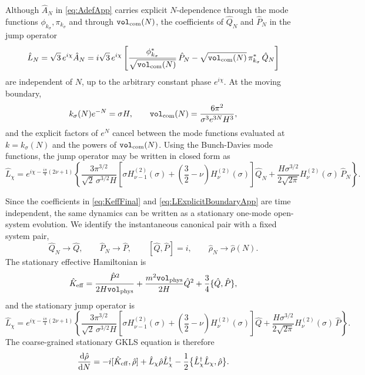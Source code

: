 \documentclass{article}
\newcommand{\VF}{\mathtt{vol}_{\rm com}}
\newcommand{\Vphys}{\mathtt{vol}_{\rm phys}}
\numberwithin{equation}{section}
\begin{document}
	Although \(\hat A_N\) in \cref{eq:AdefApp} carries explicit \(N\)-dependence through the mode functions \(\phi_{k_\sigma},\pi_{k_\sigma}\) and through \(\VF(N)\), the coefficients of \(\hat Q_N\) and \(\hat P_N\) in the jump operator
	\begin{equation}
		\hat L_N = \sqrt3\,e^{i\chi}\hat A_N = i\sqrt3\,e^{i\chi} \left[ \frac{\phi_{k_\sigma}^*}{\sqrt{\VF(N)}}\,\hat P_N - \sqrt{\VF(N)}\,\pi_{k_\sigma}^*\,\hat Q_N \right]
		\label{eq:LGeneralBoundaryApp}
	\end{equation}
	are independent of \(N\), up to the arbitrary constant phase \(e^{i\chi}\). At the moving boundary,
	\begin{equation}
		k_\sigma(N)e^{-N} = \sigma H, \qquad \VF(N) = \frac{6\pi^2}{\sigma^3 e^{3N}H^3},
	\end{equation}
	and the explicit factors of \(e^N\) cancel between the mode functions evaluated at \(k=k_\sigma(N)\) and the powers of \(\VF(N)\). Using the Bunch-Davies mode functions, the jump operator may be written in closed form as
	\begin{equation}
		\hat L_\chi = e^{i\chi-\tfrac{i\pi}{4}(2\nu+1)} \left\{ \frac{3\pi^{3/2}}{\sqrt2\,\sigma^{3/2}H} \left[ \sigma H_{\nu-1}^{(2)}(\sigma) + \left( \frac32-\nu \right)H_\nu^{(2)}(\sigma) \right]\hat Q_N + \frac{H\sigma^{3/2}}{2\sqrt{2\pi}} H_\nu^{(2)}(\sigma)\,\hat P_N \right\}.
		\label{eq:LExplicitBoundaryApp}
	\end{equation}

	Since the coefficients in \cref{eq:KeffFinal} and \cref{eq:LExplicitBoundaryApp} are time independent, the same dynamics can be written as a stationary one-mode open-system evolution. We identify the instantaneous canonical pair with a fixed system pair,
	\begin{equation}
		\hat Q_N\to \hat Q, \qquad \hat P_N\to \hat P, \qquad [\hat Q,\hat P]=i, \qquad \hat\rho_N\to\hat\rho(N).
	\end{equation}
	The stationary effective Hamiltonian is
	\begin{equation}
		\hat K_{\rm eff} = \frac{\hat P^2}{2H\Vphys} + \frac{m^2\Vphys}{2H}\hat Q^2 + \frac{3}{4}\{\hat Q,\hat P\},
		\label{eq:KeffStationaryApp}
	\end{equation}
	and the stationary jump operator is
	\begin{equation}
		\hat L_\chi = e^{i\chi-\tfrac{i\pi}{4}(2\nu+1)} \left\{ \frac{3\pi^{3/2}}{\sqrt2\,\sigma^{3/2}H} \left[ \sigma H_{\nu-1}^{(2)}(\sigma) + \left( \frac32-\nu \right)H_\nu^{(2)}(\sigma) \right]\hat Q + \frac{H\sigma^{3/2}}{2\sqrt{2\pi}} H_\nu^{(2)}(\sigma)\,\hat P \right\}.
		\label{eq:LStationaryApp}
	\end{equation}
	The coarse-grained stationary GKLS equation is therefore
	\begin{equation}
		\frac{\dd\hat\rho}{\dd N} = -i[\hat K_{\rm eff},\hat\rho] + \hat L_\chi\hat\rho\hat L_\chi^\dagger - \frac12 \bigl\{ \hat L_\chi^\dagger\hat L_\chi,\hat\rho \bigr\}.
		\label{eq:GKLSStationaryApp}
	\end{equation}
\end{document}
